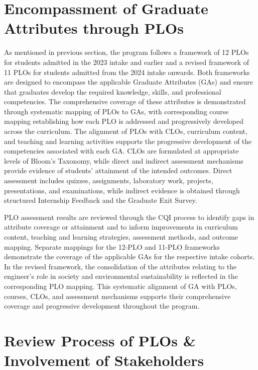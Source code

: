 \hypertarget{sec:ploga}{%
\section{Encompassment of Graduate Attributes through PLOs}\label{sec:ploga}}

As mentioned in previous section, the program follows a framework of 12 PLOs for students admitted in the 2023 intake and earlier and a revised framework of 11 PLOs for students admitted from the 2024 intake onwards. Both frameworks are designed to encompass the applicable Graduate Attributes (GAs) and ensure that graduates develop the required knowledge, skills, and professional competencies. The comprehensive coverage of these attributes is demonstrated through systematic mapping of PLOs to GAs, with corresponding course mapping establishing how each PLO is addressed and progressively developed across the curriculum. The alignment of PLOs with CLOs, curriculum content, and teaching and learning activities supports the progressive development of the competencies associated with each GA. CLOs are formulated at appropriate levels of Bloom's Taxonomy, while direct and indirect assessment mechanisms provide evidence of students' attainment of the intended outcomes. Direct assessment includes quizzes, assignments, laboratory work, projects, presentations, and examinations, while indirect evidence is obtained through structured Internship Feedback and the Graduate Exit Survey.

PLO assessment results are reviewed through the CQI process to identify gaps in attribute coverage or attainment and to inform improvements in curriculum content, teaching and learning strategies, assessment methods, and outcome mapping. Separate mappings for the 12-PLO and 11-PLO frameworks demonstrate the coverage of the applicable GAs for the respective intake cohorts. In the revised framework, the consolidation of the attributes relating to the engineer's role in society and environmental sustainability is reflected in the corresponding PLO mapping. This systematic alignment of GA with PLOs, courses, CLOs, and assessment mechanisms supports their comprehensive coverage and progressive development throughout the program.
\hypertarget{sec:ploreview}{%
\section{Review Process of PLOs \& Involvement of Stakeholders}\label{sec:ploreview}}

